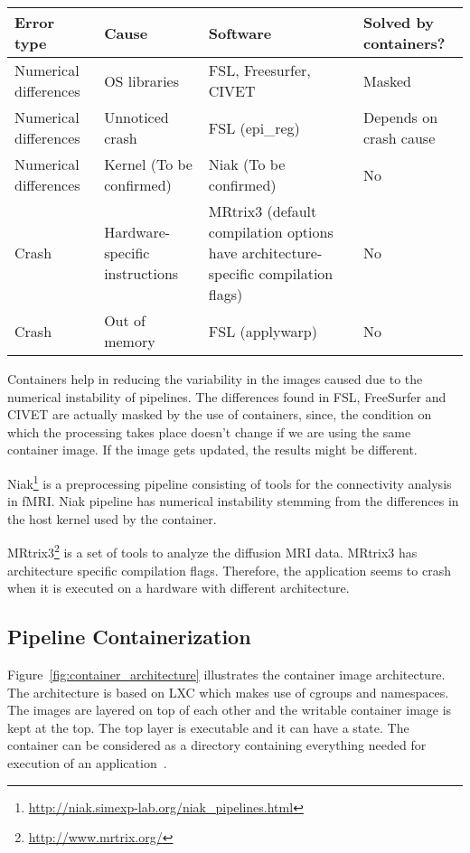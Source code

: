 \begin{center}
\tabulinesep=1.2mm
\begin{tabu} to \textwidth { | X[l] | X[l] | X[l] | X[l] |}
  \hline
  Error type & Cause & Software &  Solved by containers? \\
  \hline
  Numerical differences & OS libraries & FSL, Freesurfer, CIVET & Masked \\
  \hline
  Numerical differences & Unnoticed crash & FSL (epi\_reg) & Depends on crash cause \\
  \hline
  Numerical differences & Kernel (To be confirmed) & Niak (To be confirmed)  & No \\
  \hline
  Crash & Hardware-specific instructions & MRtrix3 (default compilation options have architecture-specific compilation flags) & No \\
  \hline
  Crash & Out of memory & FSL (applywarp) & No \\
  \hline
\end{tabu}
\label{tab:table_docker}
\end{center}

Containers help in reducing the variability in the images caused due to the numerical instability of pipelines. The differences found in FSL, FreeSurfer and CIVET are actually masked by the use of containers, since, the condition on which the processing takes place doesn't change if we are using the same container image. If the image gets updated, the results might be different.

Niak\footnote{\url{http://niak.simexp-lab.org/niak\_pipelines.html}} is a preprocessing pipeline consisting of tools for the connectivity analysis in fMRI. Niak pipeline has numerical instability stemming from the differences in the host kernel used by the container. 

MRtrix3\footnote{\url{http://www.mrtrix.org/}} is a set of tools to analyze the diffusion MRI data. MRtrix3 has architecture specific compilation flags. Therefore, the application seems to crash when it is executed on a hardware with different architecture.

\subsection{Pipeline Containerization}
Figure~\ref{fig:container_architecture} illustrates the container image architecture. The architecture is based on LXC which makes use of cgroups and namespaces. The images are layered on top of each other and the writable container image is kept at the top. The top layer is executable and it can have a state. The container can be considered as a directory containing everything needed for execution of an application~\cite{7158965}.\\

